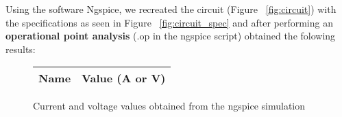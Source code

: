 \label{simulation}
Using the software Ngspice, we recreated the circuit (Figure ~\ref{fig:circuit}) with the specifications as seen in Figure ~\ref{fig:circuit_spec} and after performing an \textbf{operational point analysis} (.op in the ngspice script) obtained the folowing results:

\begin{figure}[h]
	\begin{center}
		\begin{tabular}{|c|c|}
			\hline
			\textbf{Name} & \textbf{Value (A or V)} \\
			\hline
			
		\end{tabular}
	\end{center}
	\caption{Current and voltage values obtained from the ngspice simulation}
	\label{sim_results}
\end{figure}



